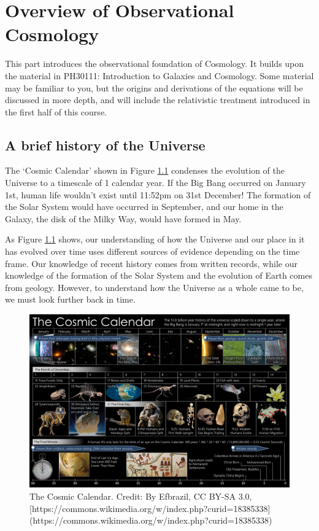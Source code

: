 \documentclass[]{book}
\begin{document}
\chapter{Overview of Observational Cosmology}\label{ch:intro_obs}

This part introduces the observational foundation of Cosmology. It
builds upon the material in PH30111: Introduction to Galaxies and
Cosmology. Some material may be familiar to you, but the origins and
derivations of the equations will be discussed in more depth, and will
include the relativistic treatment introduced in the first half of this
course.

\section{A brief history of the Universe}\label{sec:history}

The `Cosmic Calendar' shown in Figure \ref{fig:cosmic-calendar}
condenses the evolution of the Universe to a timescale of 1 calendar
year. If the Big Bang occurred on January 1st, human life wouldn't exist
until 11:52pm on 31st December! The formation of the Solar System would
have occurred in September, and our home in the Galaxy, the disk of the
Milky Way, would have formed in May.

As Figure \ref{fig:cosmic-calendar} shows, our understanding of how the
Universe and our place in it has evolved over time uses different
sources of evidence depending on the time frame. Our knowledge of recent
history comes from written records, while our knowledge of the formation
of the Solar System and the evolution of Earth comes from geology.
However, to understand how the Universe as a whole came to be, we must
look further back in time.

\begin{figure}
\includegraphics[width=1\linewidth]{Images/CosmicCalendar} \caption{The Cosmic Calendar. Credit: By Efbrazil, CC BY-SA 3.0, [https://commons.wikimedia.org/w/index.php?curid=18385338](https://commons.wikimedia.org/w/index.php?curid=18385338)}\label{fig:cosmic-calendar}
\end{figure}
\end{document}

